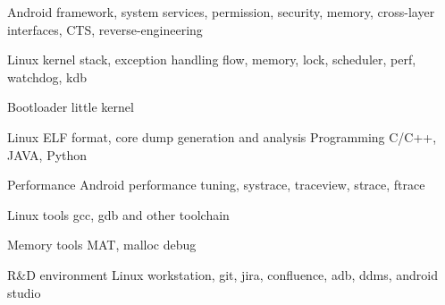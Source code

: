 

\begin{cvskills}

  \cvskill
    {Android}
    {framework, system services, permission, security, memory, cross-layer interfaces, CTS, reverse-engineering}

  \cvskill
    {Linux kernel}
    {stack, exception handling flow, memory, lock, scheduler, perf, watchdog, kdb}

  \cvskill
    {Bootloader}
    {little kernel}

  \cvskill
    {Linux}
    {ELF format, core dump generation and analysis}
  \cvskill
    {Programming} %
    {C/C++, JAVA, Python} %

  \cvskill
    {Performance} %
    {Android performance tuning, systrace, traceview, strace, ftrace} %

  \cvskill
    {Linux tools} %
    {gcc, gdb and other toolchain} %

  \cvskill
    {Memory tools}
    {MAT, malloc debug}

  \cvskill
    {R\&D environment}
    {Linux workstation, git, jira, confluence, adb, ddms, android studio}

\end{cvskills}
